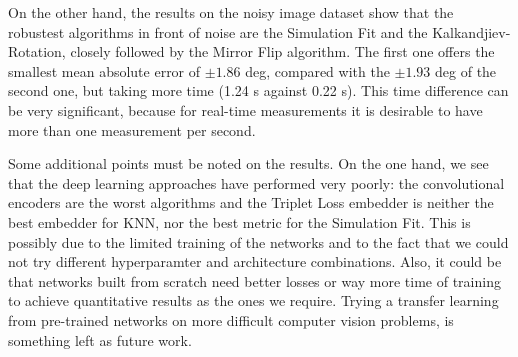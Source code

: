 \documentclass[11pt, a4paper, twoside]{article} %
\begin{document}
On the other hand, the results on the noisy image dataset show that the robustest algorithms in front of noise are the Simulation Fit and the Kalkandjiev-Rotation, closely followed by the Mirror Flip algorithm. The first one offers the smallest mean absolute error of $\pm 1.86$ deg, compared with the $\pm 1.93$ deg of the second one, but taking more time (1.24 s against 0.22 s). This time difference can be very significant, because for real-time measurements it is desirable to have more than one measurement per second.

Some additional points must be noted on the results. On the one hand, we see that the deep learning approaches have performed very poorly: the convolutional encoders are the worst algorithms and the Triplet Loss embedder is neither the best embedder for KNN, nor the best metric for the Simulation Fit. This is possibly due to the limited training of the networks and to the fact that we could not try different hyperparamter and architecture combinations. Also, it could be that networks built from scratch need better losses or way more time of training to achieve quantitative results as the ones we require. Trying a transfer learning from pre-trained networks on more difficult computer vision problems, is something left as future work.
\vspace{0.15cm}
\end{document}
